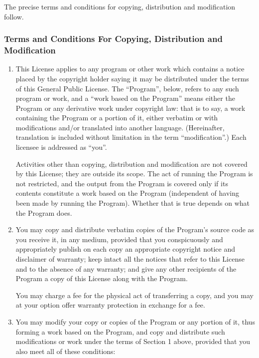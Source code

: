 \documentclass{article}
\begin{document}
The precise terms and conditions for copying, distribution and
modification follow.

\subsubsection{Terms and Conditions For Copying, Distribution and
  Modification}

\begin{enumerate}

\addtocounter{enumi}{-1}

\item
This License applies to any program or other work which contains a notice
placed by the copyright holder saying it may be distributed under the
terms of this General Public License.  The ``Program'', below, refers to
any such program or work, and a ``work based on the Program'' means either
the Program or any derivative work under copyright law: that is to say, a
work containing the Program or a portion of it, either verbatim or with
modifications and/or translated into another language.  (Hereinafter,
translation is included without limitation in the term ``modification''.)
Each licensee is addressed as ``you''.

Activities other than copying, distribution and modification are not
covered by this License; they are outside its scope.  The act of
running the Program is not restricted, and the output from the Program
is covered only if its contents constitute a work based on the
Program (independent of having been made by running the Program).
Whether that is true depends on what the Program does.

\item You may copy and distribute verbatim copies of the Program's source
  code as you receive it, in any medium, provided that you conspicuously
  and appropriately publish on each copy an appropriate copyright notice
  and disclaimer of warranty; keep intact all the notices that refer to
  this License and to the absence of any warranty; and give any other
  recipients of the Program a copy of this License along with the Program.

You may charge a fee for the physical act of transferring a copy, and you
may at your option offer warranty protection in exchange for a fee.

\item
You may modify your copy or copies of the Program or any portion
of it, thus forming a work based on the Program, and copy and
distribute such modifications or work under the terms of Section 1
above, provided that you also meet all of these conditions:


\end{enumerate}
\end{document}
